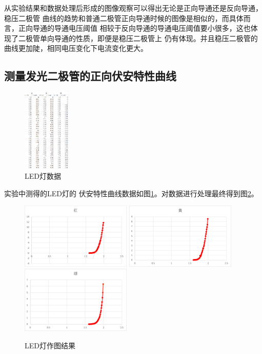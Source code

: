 \documentclass{ctexart}
\begin{document}
  从实验结果和数据处理后形成的图像观察可以得出无论是正向导通还是反向导通，稳压二极管
  曲线的趋势和普通二极管正向导通时候的图像是相似的，而具体而言，正向导通的导通电压阈值
  相较于反向导通的导通电压阈值要小很多，这也体现了二极管单向导通的性质，即便是稳压二极管上
  仍有体现。并且稳压二极管的曲线更加陡，相同电压变化下电流变化更大。
\newpage

  \subsection{测量发光二极管的正向伏安特性曲线}
  \begin{figure}[H]\label{ledshujv}
    \centering
    \begin{minipage}{\textwidth}
    \includegraphics[width=0.2\textwidth,height=0.5\textheight]{ledshujv.png}
    \end{minipage}
    \caption{LED灯数据}
  \end{figure}
    实验中测得的LED灯的
  伏安特性曲线数据如图\ref{ledshujv}。对数据进行处理最终得到图\ref{ledzuotu}。
  \begin{figure}[H]\label{ledzuotu}
    \centering
    \begin{minipage}{\linewidth}
    \includegraphics[width=0.47\textwidth,height=0.3\textheight]{ledzuotu1.png}\hfill
    \includegraphics[width=0.47\textwidth,height=0.3\textheight]{ledzuotu2.png}\hfill
    \includegraphics[width=0.47\textwidth,height=0.3\textheight]{ledzuotu3.png}
    \end{minipage}
    \caption{LED灯作图结果}
  \end{figure}
\end{document}
